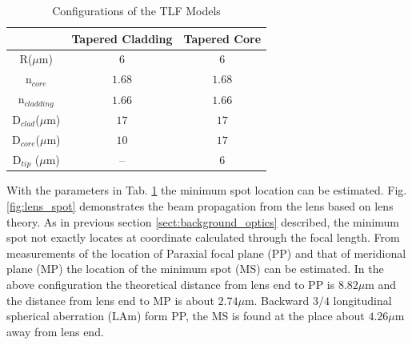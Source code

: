 \begin{table}[!ht]
\caption{Configurations of the TLF Models}
\centering
\begin{tabular}{ccc}
\hline
							&Tapered Cladding&Tapered Core\\
\hline
R($\mu$m) & $6$						 &$6$	\\
n$_{core}$&$1.68$&$1.68$\\
n$_{cladding}$&$1.66$&$1.66$\\
D$_{clad}$($\mu$m) &	$17$ &	$17$\\
D$_{core}$($\mu$m) & $10$ &	$17$\\
D$_{tip}$ ($\mu$m) & --   &	$6$\\
\hline
\end{tabular}
\label{tab:model_fiber_configuration}
\end{table}
With the parameters in Tab. \ref{tab:model_fiber_configuration} the minimum spot location can be estimated. Fig. \ref{fig:lens_spot} demonstrates the beam propagation from the lens based on lens theory. As in previous section \ref{sect:background_optics} described, the minimum spot not exactly locates at coordinate calculated through the focal length. From measurements of the location of Paraxial focal plane (PP) and that of meridional plane (MP) the location of the minimum spot (MS) can be estimated. In the above configuration the theoretical distance from lens end to PP is $8.82 \mu$m and the distance from lens end to MP is about $2.74 \mu$m. Backward $3/4$ longitudinal spherical aberration (LAm) form PP, the MS is found at the place about $4.26 \mu$m away from lens end. \\ 

